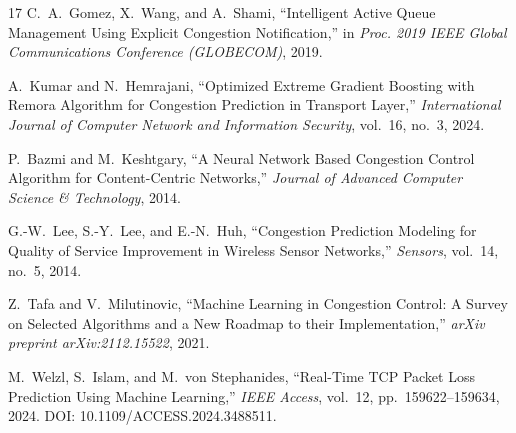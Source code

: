\begin{thebibliography}{17}
C.~A.~Gomez, X.~Wang, and A.~Shami, ``Intelligent Active Queue Management Using Explicit Congestion Notification,'' in \textit{Proc. 2019 IEEE Global Communications Conference (GLOBECOM)}, 2019.

A.~Kumar and N.~Hemrajani, ``Optimized Extreme Gradient Boosting with Remora Algorithm for Congestion Prediction in Transport Layer,'' \textit{International Journal of Computer Network and Information Security}, vol.~16, no.~3, 2024.

P.~Bazmi and M.~Keshtgary, ``A Neural Network Based Congestion Control Algorithm for Content-Centric Networks,'' \textit{Journal of Advanced Computer Science \& Technology}, 2014.

G.-W.~Lee, S.-Y.~Lee, and E.-N.~Huh, ``Congestion Prediction Modeling for Quality of Service Improvement in Wireless Sensor Networks,'' \textit{Sensors}, vol.~14, no.~5, 2014.

Z.~Tafa and V.~Milutinovic, ``Machine Learning in Congestion Control: A Survey on Selected Algorithms and a New Roadmap to their Implementation,'' \textit{arXiv preprint arXiv:2112.15522}, 2021.

M.~Welzl, S.~Islam, and M.~von Stephanides, ``Real-Time TCP Packet Loss Prediction Using Machine Learning,'' \textit{IEEE Access}, vol.~12, pp.~159622--159634, 2024. DOI: 10.1109/ACCESS.2024.3488511.

\end{thebibliography}


